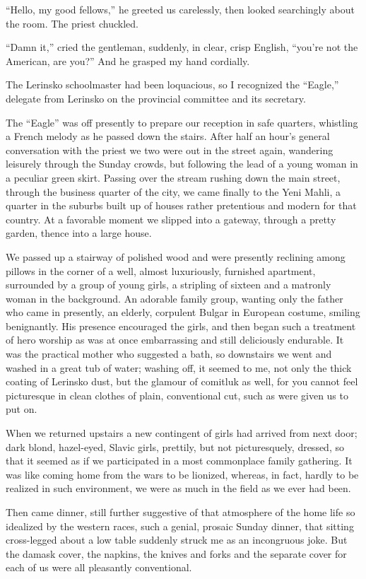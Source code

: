 \documentclass[a5paper,12pt]{book}
\begin{document}
“Hello, my good fellows,” he greeted us carelessly, then looked searchingly about the room. The priest chuckled.

“Damn it,” cried the gentleman, suddenly, in clear, crisp English, “you’re not the American, are you?” And he grasped my hand cordially.

The Lerinsko schoolmaster had been loquacious, so I recognized the “Eagle,” delegate from Lerinsko on the provincial committee and its secretary.

The “Eagle” was off presently to prepare our reception in safe quarters, whistling a French melody as he passed down the stairs. After half an hour’s general conversation with the priest we two were out in the street again, wandering leisurely through the Sunday crowds, but following the lead of a young woman in a peculiar green skirt. Passing over the stream rushing down the main street, through the business quarter of the city, we came finally to the Yeni Mahli, a quarter in the suburbs built up of houses rather pretentious and modern for that country. At a favorable moment we slipped into a gateway, through a pretty garden, thence into a large house.

We passed up a stairway of polished wood and were presently reclining among pillows in the corner of a well, almost luxuriously, furnished apartment, surrounded by a group of young girls, a stripling of sixteen and a matronly woman in the background. An adorable family group, wanting only the father who came in presently, an elderly, corpulent Bulgar in European costume, smiling benignantly. His presence encouraged the girls, and then began such a treatment of hero worship as was at once embarrassing and still deliciously endurable. It was the practical mother who suggested a bath, so downstairs we went and washed in a great tub of water; washing off, it seemed to me, not only the thick coating of Lerinsko dust, but the glamour of comitluk as well, for you cannot feel picturesque in clean clothes of plain, conventional cut, such as were given us to put on.

When we returned upstairs a new contingent of girls had arrived from next door; dark blond, hazel-eyed, Slavic girls, prettily, but not picturesquely, dressed, so that it seemed as if we participated in a most commonplace family gathering. It was like coming home from the wars to be lionized, whereas, in fact, hardly to be realized in such environment, we were as much in the field as we ever had been.

Then came dinner, still further suggestive of that atmosphere of the home life so idealized by the western races, such a genial, prosaic Sunday dinner, that sitting cross-legged about a low table suddenly struck me as an incongruous joke. But the damask cover, the napkins, the knives and forks and the separate cover for each of us were all pleasantly conventional.
\end{document}

